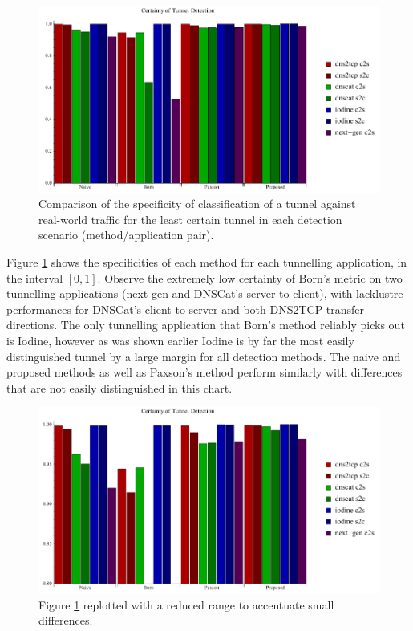 \documentclass[12pt]{report}
\theoremstyle{remark}
\theoremstyle{definition}
\theoremstyle{definition}
\theoremstyle{definition}
\begin{document}
\begin{figure}
\centering
\includegraphics[width=\textwidth]{../figures/cplot.pdf}
\caption[Chart of Specificity of Detection by Tunnel Application and Detection
Method]{Comparison of the specificity of classification of a tunnel against
real-world traffic for the least certain tunnel in each detection scenario
(method/application pair).}
\label{cplot}
\end{figure}

Figure \ref{cplot} shows the specificities of each method for each tunnelling
application, in the interval $[0,1]$. Observe the extremely
low certainty of Born's metric on two tunnelling applications (next-gen and
DNSCat's server-to-client), with lacklustre performances for DNSCat's
client-to-server and both DNS2TCP transfer directions. The only tunnelling
application that Born's method reliably picks out is Iodine, however as was
shown earlier Iodine is by far the most easily distinguished tunnel by a large
margin for all detection methods. The naive and proposed methods as well as
Paxson's method perform similarly with differences that are not easily
distinguished in this chart.

\begin{figure}
\centering
\includegraphics[width=\textwidth]{../figures/cplot2.pdf}
\caption[Chart of Certainty of Detection by Tunnel Application and Detection
Method - 0.80 to 1.00]{Figure \ref{cplot} replotted with a reduced range to
accentuate small differences.}
\label{cplot80}
\end{figure}
\end{document}
